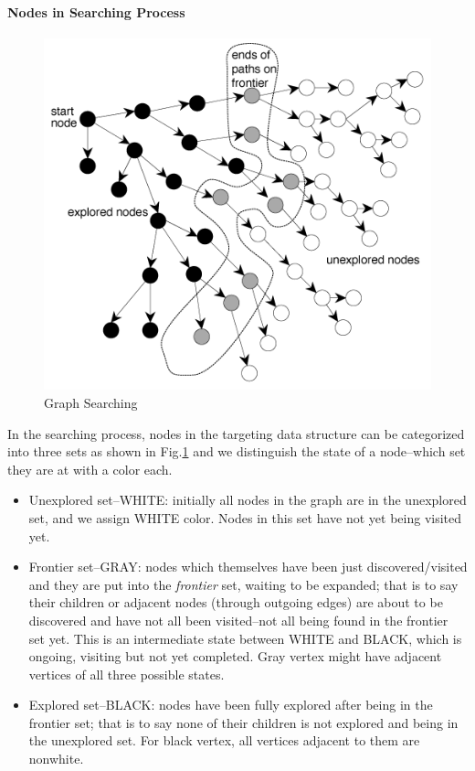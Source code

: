 \documentclass[../main.tex]{subfiles}
\begin{document}
\paragraph{Nodes in Searching Process}
\begin{figure}[!ht]
    \centering
     \includegraphics[width=0.9\columnwidth]{fig/searchsp.png}
    \caption{Graph Searching}
    \label{fig:search_sp}
\end{figure}
In the searching process, nodes in the targeting data structure can be categorized into three sets as shown in Fig.\ref{fig:search_sp} and we distinguish the state of a node--which set they are at with a color each.
\begin{itemize}
   \item Unexplored set--WHITE: initially all nodes in the graph are in the unexplored set, and we assign WHITE color. Nodes in this set have not yet being visited yet. 
    \item Frontier set--GRAY: nodes which themselves have been just discovered/visited and they are put into the \textit{frontier} set,  waiting to be expanded; that is to say their children or adjacent nodes (through outgoing edges) are about to be discovered and have not all been visited--not all being found in the frontier set yet. This is an intermediate state between WHITE and BLACK, which is ongoing, visiting but not yet completed. Gray vertex might have adjacent vertices of all three possible states.
    \item Explored set--BLACK: nodes have been fully explored after being in the frontier set; that is to say none of their children is not explored and being in the unexplored set. For black vertex, all vertices adjacent to them are nonwhite.%
\end{itemize}
\end{document}
